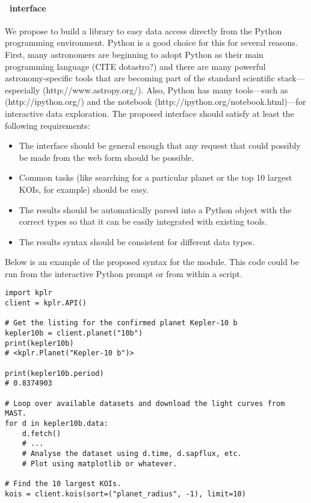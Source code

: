 \documentclass[letterpaper,12pt,preprint]{hack_aastex}
\newcommand{\kplr}{\package{kplr}}
\begin{document}
\paragraph{\kplr\ interface}
We propose to build a library to easy data access directly from the Python
programming environment.
Python is a good choice for this for several reasons.
First, many astronomers are beginning to adopt Python as their main
programming language (CITE dotastro?) and there are many powerful
astronomy-specific tools that are becoming part of the standard scientific
stack---especially  (http://www.astropy.org/).
Also, Python has many tools---such as  (http://ipython.org/)
and the  notebook (http://ipython.org/notebook.html)---for
interactive data exploration.
The proposed interface should satisfy at least the following requirements:
\begin{itemize}
\item The interface should be general enough that any request that could
possibly be made from the web form should be possible.
\item Common tasks (like searching for a particular planet or the top 10
largest KOIs, for example) should be easy.
\item The results should be automatically parsed into a Python object with the
correct types so that it can be easily integrated with existing tools.
\item The results syntax should be consistent for different data types.
\end{itemize}
Below is an example of the proposed syntax for the module.
This code could be run from the interactive Python prompt or from within a
script.

\begin{lstlisting}
import kplr
client = kplr.API()

# Get the listing for the confirmed planet Kepler-10 b
kepler10b = client.planet("10b")
print(kepler10b)
# <kplr.Planet("Kepler-10 b")>

print(kepler10b.period)
# 0.8374903

# Loop over available datasets and download the light curves from MAST.
for d in kepler10b.data:
    d.fetch()
    # ...
    # Analyse the dataset using d.time, d.sapflux, etc.
    # Plot using matplotlib or whatever.

# Find the 10 largest KOIs.
kois = client.kois(sort=("planet_radius", -1), limit=10)
\end{lstlisting}
\end{document}
